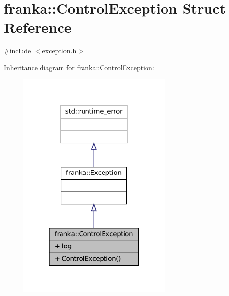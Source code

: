 \hypertarget{structfranka_1_1ControlException}{}\section{franka\+:\+:Control\+Exception Struct Reference}
\label{structfranka_1_1ControlException}


{\ttfamily \#include $<$exception.\+h$>$}



Inheritance diagram for franka\+:\+:Control\+Exception\+:
\nopagebreak
\begin{figure}[H]
\begin{center}
\leavevmode
\includegraphics[width=217pt]{structfranka_1_1ControlException__inherit__graph}
\end{center}
\end{figure}


